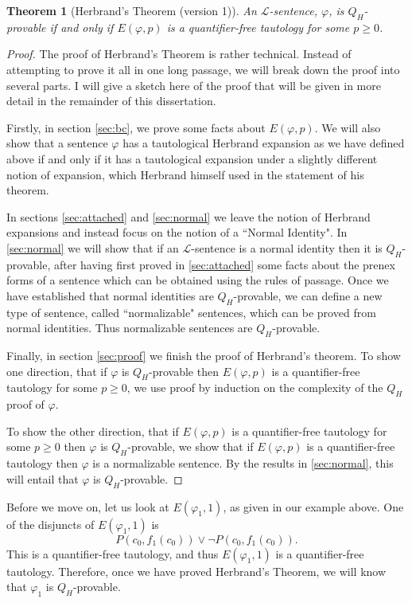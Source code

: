 \documentclass[a4paper,12pt]{report}
\newtheorem{theo}{Theorem}
\theoremstyle{definition}
\begin{document}
\begin{theo}[Herbrand's Theorem (version 1)]
An $\mathcal{L}$-sentence, $\varphi$, is $Q_H$-provable if and only if $E(\varphi, p)$ is a quantifier-free tautology for some $p \ge 0$.
\end{theo}
\begin{proof}
The proof of Herbrand's Theorem is rather technical. Instead of attempting to prove it all in one long passage, we will break down the proof into several parts. I will give a sketch here of the proof that will be given in more detail in the remainder of this dissertation.

Firstly, in section \ref{sec:bc}, we prove some facts about $E(\varphi, p)$. We will also show that a sentence $\varphi$ has a tautological Herbrand expansion as we have defined above if and only if it has a tautological expansion under a slightly different notion of expansion, which Herbrand himself used in the statement of his theorem.

In sections \ref{sec:attached} and \ref{sec:normal} we leave the notion of Herbrand expansions and instead focus on the notion of a ``Normal Identity". In \ref{sec:normal} we will show that if an $\mathcal{L}$-sentence is a normal identity then it is $Q_H$-provable, after having first proved in \ref{sec:attached} some facts about the prenex forms of a sentence which can be obtained using the rules of passage. Once we have established that normal identities are $Q_H$-provable, we can define a new type of sentence, called ``normalizable" sentences, which can be proved from normal identities. Thus normalizable sentences are $Q_H$-provable.

Finally, in section \ref{sec:proof} we finish the proof of Herbrand's theorem. To show one direction, that if $\varphi$ is $Q_H$-provable then $E(\varphi, p)$ is a quantifier-free tautology for some $p \ge 0$, we use proof by induction on the complexity of the $Q_H$ proof of $\varphi$.

To show the other direction, that if $E(\varphi, p)$ is a quantifier-free tautology for some $p \ge 0$ then $\varphi$ is $Q_H$-provable, we show that if $E(\varphi, p)$ is a quantifier-free tautology then $\varphi$ is a normalizable sentence. By the results in \ref{sec:normal}, this will entail that $\varphi$ is $Q_H$-provable.
\end{proof}

Before we move on, let us look at $E(\varphi_1, 1)$, as given in our example above. One of the disjuncts of $E(\varphi_1, 1)$ is
$$
P(c_0, f_1(c_0)) \lor \neg P(c_0, f_1(c_0)) .
$$
This is a quantifier-free tautology, and thus $E(\varphi_1, 1)$ is a quantifier-free tautology. Therefore, once we have proved Herbrand's Theorem, we will know that $\varphi_1$ is $Q_H$-provable.
\end{document}

